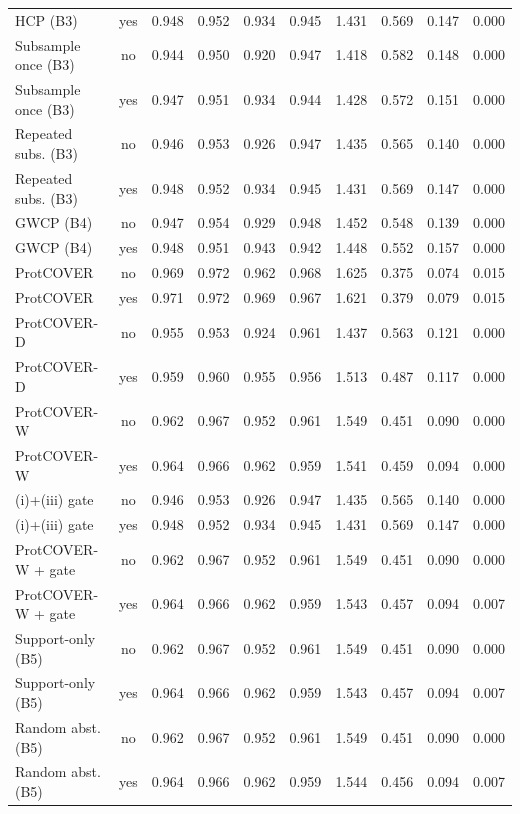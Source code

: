 \begin{longtable}{lccccccccc}
HCP (B3) & yes & 0.948 & 0.952 & 0.934 & 0.945 & 1.431 & 0.569 & 0.147 & 0.000 \\
Subsample once (B3) & no & 0.944 & 0.950 & 0.920 & 0.947 & 1.418 & 0.582 & 0.148 & 0.000 \\
Subsample once (B3) & yes & 0.947 & 0.951 & 0.934 & 0.944 & 1.428 & 0.572 & 0.151 & 0.000 \\
Repeated subs. (B3) & no & 0.946 & 0.953 & 0.926 & 0.947 & 1.435 & 0.565 & 0.140 & 0.000 \\
Repeated subs. (B3) & yes & 0.948 & 0.952 & 0.934 & 0.945 & 1.431 & 0.569 & 0.147 & 0.000 \\
GWCP (B4) & no & 0.947 & 0.954 & 0.929 & 0.948 & 1.452 & 0.548 & 0.139 & 0.000 \\
GWCP (B4) & yes & 0.948 & 0.951 & 0.943 & 0.942 & 1.448 & 0.552 & 0.157 & 0.000 \\
ProtCOVER & no & 0.969 & 0.972 & 0.962 & 0.968 & 1.625 & 0.375 & 0.074 & 0.015 \\
ProtCOVER & yes & 0.971 & 0.972 & 0.969 & 0.967 & 1.621 & 0.379 & 0.079 & 0.015 \\
ProtCOVER-D & no & 0.955 & 0.953 & 0.924 & 0.961 & 1.437 & 0.563 & 0.121 & 0.000 \\
ProtCOVER-D & yes & 0.959 & 0.960 & 0.955 & 0.956 & 1.513 & 0.487 & 0.117 & 0.000 \\
ProtCOVER-W & no & 0.962 & 0.967 & 0.952 & 0.961 & 1.549 & 0.451 & 0.090 & 0.000 \\
ProtCOVER-W & yes & 0.964 & 0.966 & 0.962 & 0.959 & 1.541 & 0.459 & 0.094 & 0.000 \\
(i)+(iii) gate & no & 0.946 & 0.953 & 0.926 & 0.947 & 1.435 & 0.565 & 0.140 & 0.000 \\
(i)+(iii) gate & yes & 0.948 & 0.952 & 0.934 & 0.945 & 1.431 & 0.569 & 0.147 & 0.000 \\
ProtCOVER-W + gate & no & 0.962 & 0.967 & 0.952 & 0.961 & 1.549 & 0.451 & 0.090 & 0.000 \\
ProtCOVER-W + gate & yes & 0.964 & 0.966 & 0.962 & 0.959 & 1.543 & 0.457 & 0.094 & 0.007 \\
Support-only (B5) & no & 0.962 & 0.967 & 0.952 & 0.961 & 1.549 & 0.451 & 0.090 & 0.000 \\
Support-only (B5) & yes & 0.964 & 0.966 & 0.962 & 0.959 & 1.543 & 0.457 & 0.094 & 0.007 \\
Random abst. (B5) & no & 0.962 & 0.967 & 0.952 & 0.961 & 1.549 & 0.451 & 0.090 & 0.000 \\
Random abst. (B5) & yes & 0.964 & 0.966 & 0.962 & 0.959 & 1.544 & 0.456 & 0.094 & 0.007 \\

\end{longtable}
